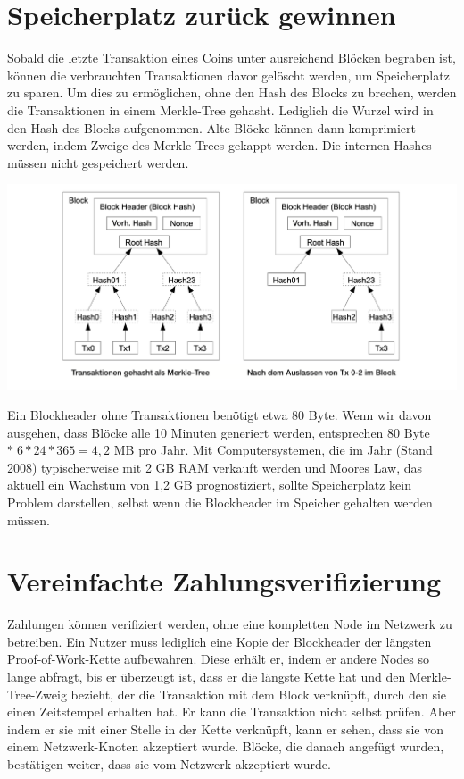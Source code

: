 \documentclass[9pt]{article}
\begin{document}
	\section{Speicherplatz zurück gewinnen}
	
	Sobald die letzte Transaktion eines Coins unter ausreichend Blöcken begraben ist, können die verbrauchten Transaktionen davor gelöscht werden, um Speicherplatz zu sparen. Um dies zu ermöglichen, ohne den Hash des Blocks zu brechen, werden die Transaktionen in einem Merkle-Tree \cite{merkle}\cite{massias}\cite{haber2} gehasht. Lediglich die Wurzel wird in den Hash des Blocks aufgenommen. Alte Blöcke können dann komprimiert werden, indem Zweige des Merkle-Trees gekappt werden. Die internen Hashes müssen nicht gespeichert werden.
	
	\begin{center}
		\includegraphics[width=\textwidth]{pics/reclaimingdiskspace.png}
	\end{center}
	
	Ein Blockheader ohne Transaktionen benötigt etwa 80 Byte. Wenn wir davon ausgehen, dass Blöcke alle 10 Minuten generiert werden, entsprechen 80 Byte $* \;6 * 24 * 365 = 4,2$ MB pro Jahr. Mit Computersystemen, die im Jahr (Stand 2008) typischerweise mit 2 GB RAM verkauft werden und Moores Law, das aktuell ein Wachstum von 1,2 GB prognostiziert, sollte Speicherplatz kein Problem darstellen, selbst wenn die Blockheader im Speicher gehalten werden müssen.
	
	\newpage
	
	\section{Vereinfachte Zahlungsverifizierung}
	
    Zahlungen können verifiziert werden, ohne eine kompletten Node im Netzwerk zu betreiben. Ein Nutzer muss lediglich eine Kopie der Blockheader der längsten Proof-of-Work-Kette aufbewahren. Diese erhält er, indem er andere Nodes so lange abfragt, bis er überzeugt ist, dass er die längste Kette hat und den Merkle-Tree-Zweig bezieht, der die Transaktion mit dem Block verknüpft, durch den sie einen Zeitstempel erhalten hat. Er kann die Transaktion nicht selbst prüfen. Aber indem er sie mit einer Stelle in der Kette verknüpft, kann er sehen, dass sie von einem Netzwerk-Knoten akzeptiert wurde. Blöcke, die danach angefügt wurden, bestätigen weiter, dass sie vom Netzwerk akzeptiert wurde.
	
\end{document}
